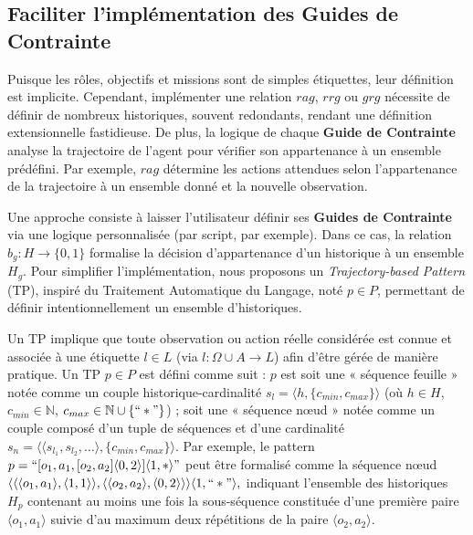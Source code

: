 \documentclass[francais,ROIA,Unicode,manuscript]{cedram}
\begin{document}
\subsection{Faciliter l'implémentation des \textbf{Guides de Contrainte}}

Puisque les rôles, objectifs et missions sont de simples étiquettes, leur définition est implicite. Cependant, implémenter une relation \(rag\), \(rrg\) ou \(grg\) nécessite de définir de nombreux historiques, souvent redondants, rendant une définition extensionnelle fastidieuse. De plus, la logique de chaque \textbf{Guide de Contrainte} analyse la trajectoire de l'agent pour vérifier son appartenance à un ensemble prédéfini. Par exemple, \(rag\) détermine les actions attendues selon l'appartenance de la trajectoire à un ensemble donné et la nouvelle observation.

Une approche consiste à laisser l'utilisateur définir ses \textbf{Guides de Contrainte} via une logique personnalisée (par script, par exemple). Dans ce cas, la relation \(b_g: H \to \{0,1\}\) formalise la décision d'appartenance d'un historique à un ensemble \(H_g\).
Pour simplifier l'implémentation, nous proposons un \textit{Trajectory-based Pattern} (TP), inspiré du Traitement Automatique du Langage, noté \(p \in P\), permettant de définir intentionnellement un ensemble d'historiques.

Un TP implique que toute observation ou action réelle considérée est connue et associée à une étiquette \(l \in L\) (via \(l: \Omega \cup A \to L\)) afin d'être gérée de manière pratique. Un TP \(p \in P\) est défini comme suit : \(p\) est soit une « séquence feuille » notée comme un couple historique-cardinalité \(s_l = \langle h, \{c_{min}, c_{max}\} \rangle\) (où \(h \in H\), \(c_{min} \in \mathbb{N}\), \(c_{max} \in \mathbb{N} \cup \{``*"\}\)) ; soit une « séquence nœud » notée comme un couple composé d'un tuple de séquences et d'une cardinalité \(s_n = \langle \langle s_{l_1}, s_{l_2}, \dots \rangle, \{c_{min}, c_{max}\} \rangle\). Par exemple, le pattern
$
    p = ``[o_1,a_1,[o_2,a_2]\langle0,2\rangle]\langle1,*\rangle"
$
peut être formalisé comme la séquence nœud
$
    \langle \langle \langle o_1,a_1\rangle,\langle 1,1 \rangle \rangle, \langle \langle o_2,a_2\rangle,\langle 0,2 \rangle \rangle \rangle \langle 1,``*"\rangle,
$
indiquant l'ensemble des historiques \(H_p\) contenant au moins une fois la sous-séquence constituée d'une première paire \(\langle o_1,a_1\rangle\) suivie d'au maximum deux répétitions de la paire \(\langle o_2,a_2\rangle\).
\end{document}
